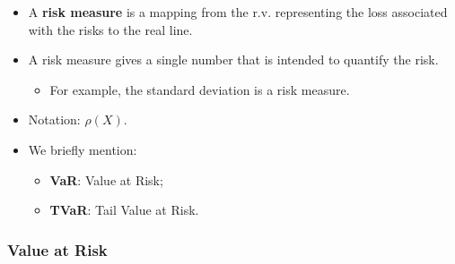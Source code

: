 \documentclass[]{book}
\providecommand{\tightlist}{%
  \setlength{\itemsep}{0pt}\setlength{\parskip}{0pt}}
\theoremstyle{definition}
\theoremstyle{definition}
\theoremstyle{definition}
\theoremstyle{remark}
\begin{document}
\begin{itemize}
\item
  A \textbf{risk measure} is a mapping from the r.v. representing the
  loss associated with the risks to the real line.
\item
  A risk measure gives a single number that is intended to quantify the
  risk.

  \begin{itemize}
  \tightlist
  \item
    For example, the standard deviation is a risk measure.
  \end{itemize}
\item
  Notation: \(\rho(X)\).
\item
  We briefly mention:

  \begin{itemize}
  \item
    \textbf{VaR}: Value at Risk;
  \item
    \textbf{TVaR}: Tail Value at Risk.
  \end{itemize}
\end{itemize}

\subsubsection{Value at Risk}\label{value-at-risk}
\end{document}
